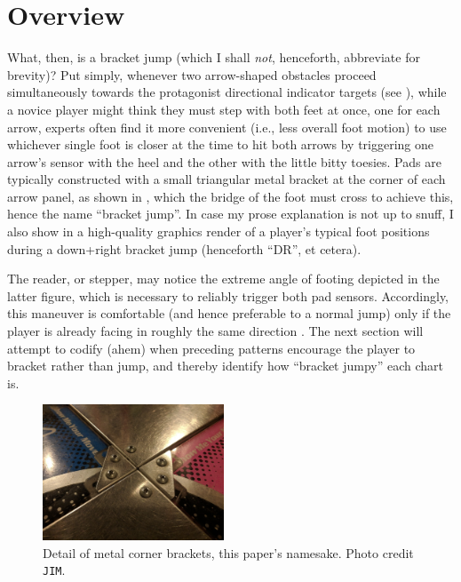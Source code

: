 \documentclass[10pt]{sigplanconf}
\begin{document}
\section{Overview}


What, then, is a bracket jump (which I shall \textit{not}, henceforth, abbreviate for brevity)?
Put simply, whenever two arrow-shaped obstacles proceed simultaneously towards the protagonist directional indicator targets
(see \cite{turniness}),
while a novice player might think they must step with both feet at once, one for each arrow,
experts often find it more convenient (i.e., less overall foot motion) to use whichever single foot is closer at the time
to hit both arrows by
triggering one arrow's sensor with the heel and the other with the little bitty toesies.
Pads are typically constructed with a small triangular metal bracket at the corner of each arrow panel,
as shown in ,
which the bridge of the foot must cross to achieve this, hence the name ``bracket jump''.
In case my prose explanation is not up to snuff, I also show in 
a high-quality graphics render of a player's typical foot positions during a down+right bracket jump (henceforth ``DR'', et cetera).

The reader, or stepper,
may notice the extreme angle of footing depicted in the latter figure,
which is necessary to reliably trigger both pad sensors.
Accordingly, this maneuver is comfortable (and hence preferable to a normal jump)
only if the player is already facing in roughly the same direction \cite{turniness}.
The next section will attempt to codify (ahem) when
preceding patterns encourage the player to bracket rather than jump,
and thereby identify how ``bracket jumpy'' each chart is.

\begin{figure}[t]
	\begin{center}
		\includegraphics[width=0.48\textwidth]{jims-pix.jpg}
	\end{center}
	\caption{Detail of metal corner brackets, this paper's namesake. Photo credit {\tt JIM}.}
	\label{fig:bracker-detail}
\end{figure}
\end{document}
